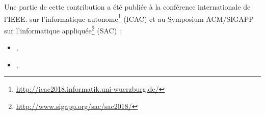 %
Une partie de cette contribution a été publiée à la conférence internationale de l'IEEE.
sur l'informatique autonome\footnote{\url{http://icac2018.informatik.uni-wuerzburg.de/}} (ICAC) et au Symposium ACM/SIGAPP sur l'informatique appliquée\footnote{\url{http://www.sigapp.org/sac/sac2018/}} (SAC) :
\begin{itemize}
	\item {}, \citeauthor{DBLP:conf/sac/MoulineB0FBMB18}
	\item {}, \citeauthor{DBLP:conf/icac/MoulineBFBB18}
\end{itemize}


